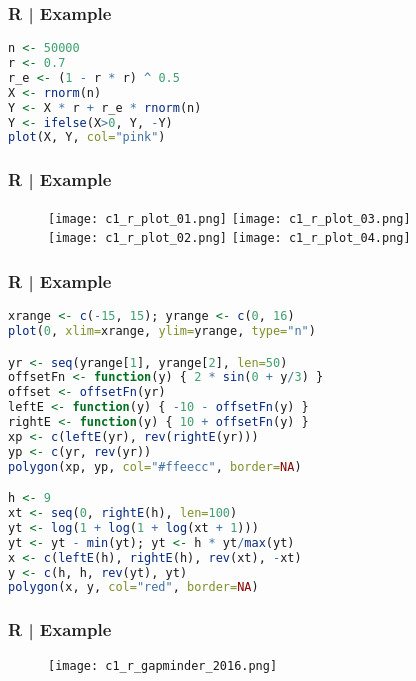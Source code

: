 \begin{frame}[fragile]
  \frametitle{R | Example}
\begin{lstlisting}[language=R]
n <- 50000
r <- 0.7
r_e <- (1 - r * r) ^ 0.5
X <- rnorm(n)
Y <- X * r + r_e * rnorm(n)
Y <- ifelse(X>0, Y, -Y)
plot(X, Y, col="pink")
\end{lstlisting}
\end{frame}

\begin{frame}
  \frametitle{R | Example}
  \begin{figure}
    \centering
    \texttt{[image: c1\_r\_plot\_01.png]}\qquad
    \texttt{[image: c1\_r\_plot\_03.png]}\\
    \texttt{[image: c1\_r\_plot\_02.png]}
    \hspace{4em}
    \texttt{[image: c1\_r\_plot\_04.png]}
  \end{figure}
\end{frame}

\begin{frame}[fragile]
  \frametitle{R | Example}
\begin{lstlisting}[language=R,basicstyle=\footnotesize\tt]
xrange <- c(-15, 15); yrange <- c(0, 16)
plot(0, xlim=xrange, ylim=yrange, type="n")

yr <- seq(yrange[1], yrange[2], len=50)
offsetFn <- function(y) { 2 * sin(0 + y/3) }
offset <- offsetFn(yr)
leftE <- function(y) { -10 - offsetFn(y) }
rightE <- function(y) { 10 + offsetFn(y) }
xp <- c(leftE(yr), rev(rightE(yr)))
yp <- c(yr, rev(yr))
polygon(xp, yp, col="#ffeecc", border=NA)

h <- 9
xt <- seq(0, rightE(h), len=100)
yt <- log(1 + log(1 + log(xt + 1)))
yt <- yt - min(yt); yt <- h * yt/max(yt)
x <- c(leftE(h), rightE(h), rev(xt), -xt)
y <- c(h, h, rev(yt), yt)
polygon(x, y, col="red", border=NA)
\end{lstlisting}
\end{frame}

\begin{frame}
  \frametitle{R | Example}
  \begin{figure}
    \centering
    \texttt{[image: c1\_r\_gapminder\_2016.png]}
  \end{figure}
\end{frame}

